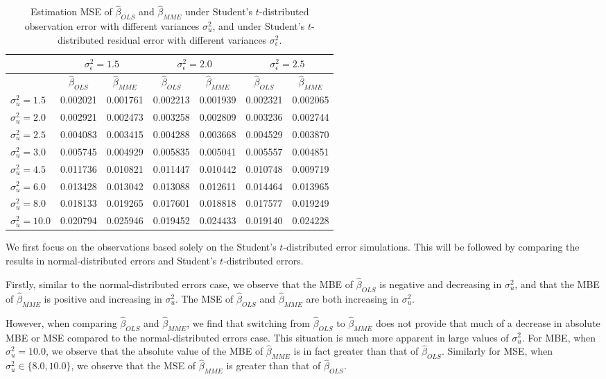 \documentclass{article}
\begin{document}
\begin{table}[ht]
    \centering
    \caption{Estimation MSE of $\hat{\beta}_{OLS}$ and $\hat{\beta}_{MME}$ under Student's $t$-distributed observation error with different variances $\sigma^2_u$, and under Student's $t$-distributed residual error with different variances $\sigma^2_\epsilon$.}
    \label{Tab:MSE_t}
    \begin{tabular}[t]{lcccccc}
        \hline
        &\multicolumn{2}{c}{$\sigma^2_\epsilon=1.5$}&\multicolumn{2}{c}{$\sigma^2_\epsilon=2.0$}&\multicolumn{2}{c}{$\sigma^2_\epsilon=2.5$}\\
        \hline
        &$\hat{\beta}_{OLS}$&$\hat{\beta}_{MME}$&$\hat{\beta}_{OLS}$&$\hat{\beta}_{MME}$&$\hat{\beta}_{OLS}$&$\hat{\beta}_{MME}$\\
        \hline
        $\sigma^2_u = 1.5$&0.002021&0.001761&0.002213&0.001939&0.002321&0.002065\\
        $\sigma^2_u = 2.0$&0.002921&0.002473&0.003258&0.002809&0.003236&0.002744\\
        $\sigma^2_u = 2.5$&0.004083&0.003415&0.004288&0.003668&0.004529&0.003870\\
        $\sigma^2_u = 3.0$&0.005745&0.004929&0.005835&0.005041&0.005557&0.004851\\
        $\sigma^2_u = 4.5$&0.011736&0.010821&0.011447&0.010442&0.010748&0.009719\\
        $\sigma^2_u = 6.0$&0.013428&0.013042&0.013088&0.012611&0.014464&0.013965\\
        $\sigma^2_u = 8.0$&0.018133&0.019265&0.017601&0.018818&0.017577&0.019249\\
        $\sigma^2_u = 10.0$&0.020794&0.025946&0.019452&0.024433&0.019140&0.024228\\
        \hline
    \end{tabular}
\end{table}

We first focus on the observations based solely on the Student's $t$-distributed error simulations. This will be followed by comparing the results in normal-distributed errors and Student's $t$-distributed errors. 

Firstly, similar to the normal-distributed errors case, we observe that the MBE of $\hat{\beta}_{OLS}$ is negative and decreasing in $\sigma^2_u$,
and that the MBE of $\hat{\beta}_{MME}$ is positive and increasing in $\sigma^2_u$.
The MSE of $\hat{\beta}_{OLS}$ and $\hat{\beta}_{MME}$ are both increasing in $\sigma^2_u$.

However, when comparing $\hat{\beta}_{OLS}$ and $\hat{\beta}_{MME}$,
we find that switching from $\hat{\beta}_{OLS}$ to $\hat{\beta}_{MME}$ does not provide that much of a decrease in absolute MBE or MSE
compared to the normal-distributed errors case.
This situation is much more apparent in large values of $\sigma^2_u$.
For MBE, when $\sigma^2_u = 10.0$, we observe that the absolute value of the MBE of $\hat{\beta}_{MME}$ is in fact greater than that of $\hat{\beta}_{OLS}$.
Similarly for MSE, when $\sigma^2_u \in \{8.0, 10.0\}$, we observe that the MSE of $\hat{\beta}_{MME}$ is greater than that of $\hat{\beta}_{OLS}$.
\end{document}
